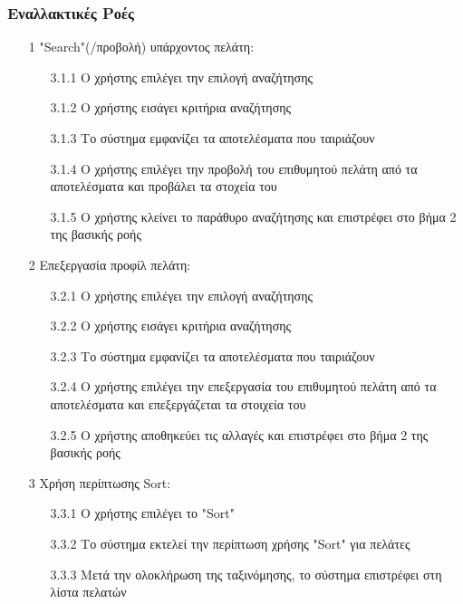 \documentclass[12pt,a4paper,twoside]{book}
\begin{document}
\subsubsection{Εναλλακτικές Ροές}
\begin{enumerate}
  \item[1 ] "Search"(/προβολή) υπάρχοντος πελάτη: %
        \begin{enumerate}
          \item[3.1.1 ] Ο χρήστης επιλέγει την επιλογή αναζήτησης
          \item[3.1.2 ] Ο χρήστης εισάγει κριτήρια αναζήτησης %
          \item[3.1.3 ] Το σύστημα εμφανίζει τα αποτελέσματα που ταιριάζουν
          \item[3.1.4 ] Ο χρήστης επιλέγει την προβολή του επιθυμητού πελάτη από τα αποτελέσματα και προβάλει τα στοχεία του
          \item[3.1.5 ] Ο χρήστης κλείνει το παράθυρο αναζήτησης και επιστρέφει στο βήμα 2 της βασικής ροής
        \end{enumerate}
  \item[2 ] Επεξεργασία προφίλ πελάτη:
        \begin{enumerate}
          \item [3.2.1 ] Ο χρήστης επιλέγει την επιλογή αναζήτησης
          \item [3.2.2 ] Ο χρήστης εισάγει κριτήρια αναζήτησης %
          \item [3.2.3 ] Το σύστημα εμφανίζει τα αποτελέσματα που ταιριάζουν
          \item [3.2.4 ] Ο χρήστης επιλέγει την επεξεργασία του επιθυμητού πελάτη από τα αποτελέσματα και επεξεργάζεται τα στοιχεία του
          \item [3.2.5 ] Ο χρήστης αποθηκεύει τις αλλαγές και επιστρέφει στο βήμα 2 της βασικής ροής
        \end{enumerate}
  \item[3 ] Χρήση περίπτωσης Sort:
        \begin{enumerate}
          \item [3.3.1 ] Ο χρήστης επιλέγει το "Sort" %
          \item [3.3.2 ] Το σύστημα εκτελεί την περίπτωση χρήσης "Sort" για πελάτες  %
          \item [3.3.3 ] Μετά την ολοκλήρωση της ταξινόμησης, το σύστημα επιστρέφει στη λίστα πελατών
        \end{enumerate}

\end{enumerate}
\end{document}
